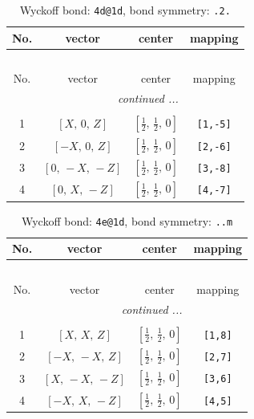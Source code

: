 \documentclass[fleqn,8pt]{jsarticle}
\begin{document}
\begin{longtable}{cccc}
\caption{Wyckoff bond: {\tt 4d@1d}, bond symmetry: {\tt .2.}}
 \\
 \hline \hline
No. & vector & center & mapping \\ \hline \endfirsthead

\multicolumn{3}{l}{\tablename\ \thetable{}} \\
 \hline \hline
No. & vector & center & mapping \\ \hline \endhead

 \hline \hline
\multicolumn{3}{r}{\footnotesize\it continued ...} \\ \endfoot

 \hline \hline
\multicolumn{3}{r}{} \\ \endlastfoot

1 & $\left[ X,\, 0,\, Z \right]$ & $\left[ \frac{1}{2},\, \frac{1}{2},\, 0 \right]$ & {\tt [1,-5]} \\ \hline
2 & $\left[ - X,\, 0,\, Z \right]$ & $\left[ \frac{1}{2},\, \frac{1}{2},\, 0 \right]$ & {\tt [2,-6]} \\ \hline
3 & $\left[ 0,\, - X,\, - Z \right]$ & $\left[ \frac{1}{2},\, \frac{1}{2},\, 0 \right]$ & {\tt [3,-8]} \\ \hline
4 & $\left[ 0,\, X,\, - Z \right]$ & $\left[ \frac{1}{2},\, \frac{1}{2},\, 0 \right]$ & {\tt [4,-7]} \\
\end{longtable}
\renewcommand{\arraystretch}{1.2}
\begin{longtable}{cccc}
\caption{Wyckoff bond: {\tt 4e@1d}, bond symmetry: {\tt ..m}}
 \\
 \hline \hline
No. & vector & center & mapping \\ \hline \endfirsthead

\multicolumn{3}{l}{\tablename\ \thetable{}} \\
 \hline \hline
No. & vector & center & mapping \\ \hline \endhead

 \hline \hline
\multicolumn{3}{r}{\footnotesize\it continued ...} \\ \endfoot

 \hline \hline
\multicolumn{3}{r}{} \\ \endlastfoot

1 & $\left[ X,\, X,\, Z \right]$ & $\left[ \frac{1}{2},\, \frac{1}{2},\, 0 \right]$ & {\tt [1,8]} \\ \hline
2 & $\left[ - X,\, - X,\, Z \right]$ & $\left[ \frac{1}{2},\, \frac{1}{2},\, 0 \right]$ & {\tt [2,7]} \\ \hline
3 & $\left[ X,\, - X,\, - Z \right]$ & $\left[ \frac{1}{2},\, \frac{1}{2},\, 0 \right]$ & {\tt [3,6]} \\ \hline
4 & $\left[ - X,\, X,\, - Z \right]$ & $\left[ \frac{1}{2},\, \frac{1}{2},\, 0 \right]$ & {\tt [4,5]} \\
\end{longtable}
\end{document}
